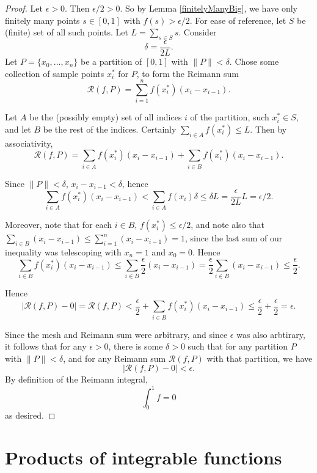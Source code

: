 \documentclass[12pt]{article}
\newcommand\norm[1]{\lVert#1\rVert} %
\newcommand\rsum[2]{\mathcal{R} (#1,#2)} %
\theoremstyle{definition}
\begin{document}
\begin{proof}

    Let $\epsilon > 0$. Then $\epsilon/2 > 0$. So by Lemma \ref{finitelyManyBig}, we have only finitely many points $s\in [0,1]$ with $ f(s) > \epsilon /2 $. For ease of reference, let $S$ be (finite) set of all such points. Let $L = \sum_{s\in S}s$. Consider 
    \[
        \delta = \frac{\epsilon}{2L}.
        \]
    Let $P = \{x_0, \dots, x_n\}$ be a partition of $ [0,1] $ with $\norm{P} < \delta$. Chose some collection of sample points $x_i^*$ for $P$, to form the Reimann sum 
    \[
    \mathcal{R}(f,P) = \sum_{i=1}^n f(x_i^*)(x_i - x_{i - 1}).     
    \]

    Let $A$ be the (possibly empty) set of all indices $i$ of the partition, such $x_i^*\in S$, and let $B$ be the rest of the indices. Certainly $ \sum_{i\in A}f(x_i^*) \le L $. Then by associativity,
    \[
        \mathcal{R}(f,P) = \sum_{i \in A}f(x_i^*)(x_i - x_{i-1}) + \sum_{i\in B}f(x_i^*)(x_i - x_{i-1}).
        \]

    Since $ \norm{P} < \delta $, $ x_i - x_{i -1} < \delta$, hence 
    \[
    \sum_{i \in A}f(x_i^*)(x_i - x_{i -1}) < \sum_{i \in A}f(x_i)\delta \le \delta L = \frac{\epsilon}{2L}L = \epsilon/2.   
    \]

    Moreover, note that for each $i\in B$, $ f(x_i^*)\le \epsilon/2 $, and note also that $\sum_{i\in B}(x_i - x_{i-1})\le \sum_{i = 1}^n (x_i - x_{i - 1}) = 1$, since the last sum of our inequality was telescoping with $x_n = 1$ and $x_0 = 0$. Hence 
    \[
    \sum_{i\in B}f(x_i^*)(x_i - x_{i - 1}) \le \sum_{i\in B}\frac{\epsilon}{2}(x_i - x_{i - 1}) = \frac{\epsilon}{2}\sum_{i\in B}(x_i - x_{i - 1}) 
    \le \frac{\epsilon}{2}.    
    \]

    Hence 
    \[
        \left|\rsum{f}{P} - 0\right| = \rsum{f}{P} < \frac{\epsilon}{2} + \sum_{i \in B}f(x_i^*)(x_i - x_{i - 1}) \le \frac{\epsilon}{2} + \frac{\epsilon}{2} = \epsilon.
        \]

    Since the mesh and Reimann sum were arbitrary, and since $\epsilon$ was also arbtirary, it follows that for any $\epsilon > 0$, there is some $\delta > 0$ such that for any partition $P$ with $\norm{P} < \delta$, and for any Reimann sum $\rsum{f}{P}$ with that partition, we have 
    \[
    \left|\rsum{f}{P} - 0\right| < \epsilon.    
    \]
    By definition of the Reimann integral, 
    \[
    \int_0^1f = 0    
    \]
    as desired.
\end{proof}

\section{Products of integrable functions}
\end{document}
